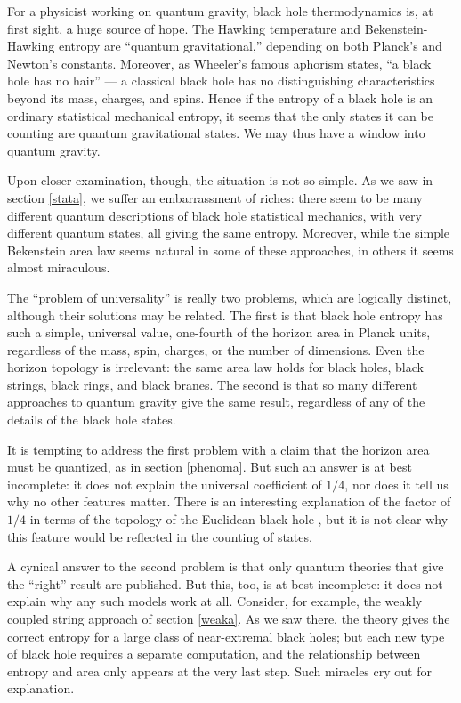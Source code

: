 \documentclass[12pt]{article}
\makeatletter
\def\section{\@startsection{section}{1}{\z@}{3.5ex plus 1ex minus
   .2ex}{2.3ex plus .2ex}{\large\bf}}
\makeatother
\begin{document}
\section{The problem of universality \label{universa}}

For a physicist working on quantum gravity,  black hole 
thermodynamics is, at first sight, a huge source of hope.
The Hawking temperature and Bekenstein-Hawking entropy are
``quantum gravitational,'' depending on both
Planck's and Newton's constants.  Moreover, as Wheeler's
famous aphorism states, ``a black hole has no hair'' ---  a classical
black hole has no  distinguishing characteristics 
beyond its mass, charges, and spins.  Hence if the entropy of a black 
hole is an ordinary statistical mechanical entropy, it seems that the 
only states it can be counting are quantum gravitational states.  We 
may thus have a window into quantum gravity.

Upon closer examination, though, the situation is not so simple.  As
we saw in section \ref{stata}, we suffer an embarrassment of riches: 
there seem to be many different quantum descriptions of black
hole statistical mechanics, with very different quantum
states, all giving the same entropy.  Moreover, while the simple
Bekenstein area law seems natural in some of these
approaches, in others it seems almost miraculous.

The ``problem of universality'' is really two problems, which are 
logically distinct, although their solutions may be related.  The
first is that black hole entropy has such a simple, universal value,
one-fourth of the horizon area in Planck units, regardless 
of the mass, spin, charges, or the number of dimensions.  Even
the horizon topology is irrelevant: the same area law holds for
black holes, black strings, black rings, and black branes.  The
second is that so many different approaches to quantum gravity
give the same result, regardless of any of the details of the
black hole states.

It is tempting to address the first problem with a claim 
that the horizon area must be quantized, as in section
\ref{phenoma}.  But such an answer is at best incomplete: it
does not explain the universal coefficient of $1/4$, nor does
it tell us why no other features matter.  There is an 
interesting explanation of the factor of $1/4$ in terms of the 
topology of the Euclidean black hole \cite{BTZa}, but it is not 
clear why this feature would be reflected in the counting of states.

A cynical answer to the second problem is that only quantum
theories that give the ``right'' result are published.
But this, too, is at best incomplete: it does not explain why any
such models work at all.  Consider, for example, the weakly 
coupled string approach of section \ref{weaka}.  As we saw
there, the theory gives the correct entropy for a large class of
near-extremal black holes; but each new type of black hole
requires a separate computation, and the relationship between
entropy and area only appears at the very last step.  Such  
miracles cry out for explanation.
\end{document}
